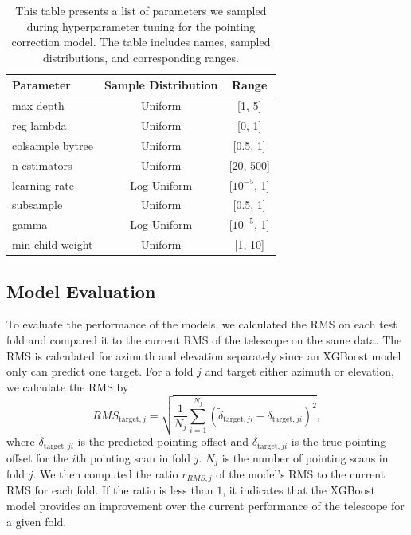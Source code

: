 \begin{table}[H]
    \centering
    \caption{This table presents a list of parameters we sampled during hyperparameter tuning for the pointing correction model. The table includes names, sampled distributions, and corresponding ranges.}
    \begin{tabular}{lcc}
        \hline
        \textbf{Parameter} & \textbf{Sample Distribution} & \textbf{Range} \\ \hline
        max depth & Uniform & [1, 5] \\ 
        reg lambda & Uniform & [0, 1] \\ 
        colsample bytree & Uniform & [0.5, 1] \\ 
        n estimators & Uniform & [20, 500] \\ 
        learning rate & Log-Uniform & [$10^{-5}$, 1] \\ 
        subsample & Uniform & [0.5, 1] \\ 
        gamma & Log-Uniform & [$10^{-5}$, 1] \\ 
        min child weight & Uniform & [1, 10] \\ 
        \hline
    \end{tabular}
    \label{tab:xgb_hyperparameters_pcorr}
\end{table}



\subsection{Model Evaluation}
To evaluate the performance of the models, we calculated the RMS on each test fold and compared it to the current RMS of the telescope on the same data.
The RMS is calculated for azimuth and elevation separately since an XGBoost model only can predict one target.
For a fold $j$ and target either azimuth or elevation, we calculate the RMS by
\begin{equation}
    RMS_{\text{target},j} = \sqrt{\frac{1}{N_j}\sum_{i=1}^{N_j} (\tilde{\delta}_{\text{target},ji} - \delta_{\text{target},ji})^2},
\end{equation}
where $\tilde{\delta}_{\text{target},ji}$ is the predicted pointing offset and $\delta_{\text{target},ji}$ is the true pointing offset for the $i$th pointing scan in fold $j$.
$N_j$ is the number of pointing scans in fold $j$. 
We then computed the ratio $r_{RMS,j}$ of the model's RMS to the current RMS for each fold.
If the ratio is less than $1$, it indicates that the XGBoost model provides an improvement over the current performance of the telescope for a given fold.

